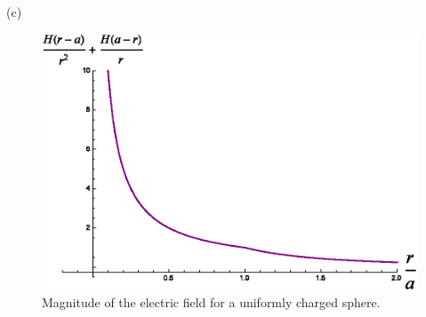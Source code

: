 \begin{homeworkProblem}
\begin{homeworkSection}{(c)}
\begin{figure}%
\centerline{\includegraphics[width=.75\columnwidth,height=.25\paperheight]{./Images/nsphereequalsminustwo.eps}}%
\caption{Magnitude of the electric field for a uniformly charged sphere.}%
\label{nisminustwo}%
\end{figure}

\end{homeworkSection}

\end{homeworkProblem}

